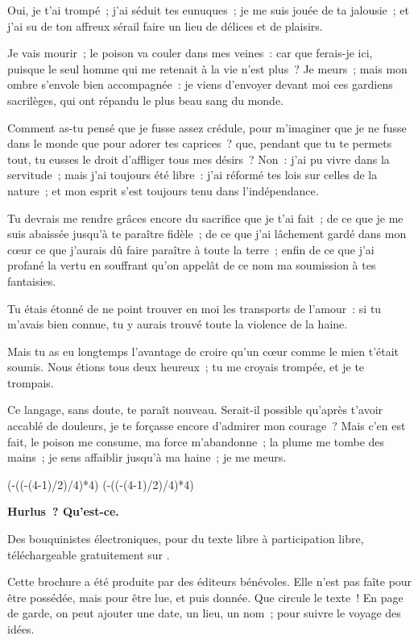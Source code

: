\documentclass[french,twoside]{book} %
\newcommand{\dateline}[1]{\medskip{\RaggedLeft{#1}\par}\bigskip}
\def\truncdiv#1#2{((#1-(#2-1)/2)/#2)}
\def\moduloop#1#2{(#1-\truncdiv{#1}{#2}*#2)}
\def\modulo#1#2{\number\numexpr\moduloop{#1}{#2}\relax}
\begin{document}
\noindent Oui, je t’ai trompé ; j’ai séduit tes eunuques ; je me suis jouée de ta jalousie ; et j’ai su de ton affreux sérail faire un lieu de délices et de plaisirs.\par
Je vais mourir ; le poison va couler dans mes veines : car que ferais-je ici, puisque le seul homme qui me retenait à la vie n’est plus ? Je meurs ; mais mon ombre s’envole bien accompagnée : je viens d’envoyer devant moi ces gardiens sacrilèges, qui ont répandu le plus beau sang du monde.\par
Comment as-tu pensé que je fusse assez crédule, pour m’imaginer que je ne fusse dans le monde que pour adorer tes caprices ? que, pendant que tu te permets tout, tu eusses le droit d’affliger tous mes désirs ? Non : j’ai pu vivre dans la servitude ; mais j’ai toujours été libre : j’ai réformé tes lois sur celles de la nature ; et mon esprit s’est toujours tenu dans l’indépendance.\par
Tu devrais me rendre grâces encore du sacrifice que je t’ai fait ; de ce que je me suis abaissée jusqu’à te paraître fidèle ; de ce que j’ai lâchement gardé dans mon cœur ce que j’aurais dû faire paraître à toute la terre ; enfin de ce que j’ai profané la vertu en souffrant qu’on appelât de ce nom ma soumission à tes fantaisies.\par
Tu étais étonné de ne point trouver en moi les transports de l’amour : si tu m’avais bien connue, tu y aurais trouvé toute la violence de la haine.\par
Mais tu as eu longtemps l’avantage de croire qu’un cœur comme le mien t’était soumis. Nous étions tous deux heureux ; tu me croyais trompée, et je te trompais.\par
Ce langage, sans doute, te paraît nouveau. Serait-il possible qu’après t’avoir accablé de douleurs, je te forçasse encore d’admirer mon courage ? Mais c’en est fait, le poison me consume, ma force m’abandonne ; la plume me tombe des mains ; je sens affaiblir jusqu’à ma haine ; je me meurs.\par

\dateline{Du sérail d’Ispahan, le 8 de la lune de Rebiab I, 1720.}
 


\ifbooklet
  \pagestyle{empty}
  \clearpage
  \ifnum\modulo{\value{page}}{4}=0 \hbox{}\newpage\hbox{}\newpage\fi
  \ifnum\modulo{\value{page}}{4}=1 \hbox{}\newpage\hbox{}\newpage\fi


  \hbox{}\newpage
  \ifodd\value{page}\hbox{}\newpage\fi
  {\centering\color{rubric}\bfseries\noindent\large
    Hurlus ? Qu’est-ce.\par
    \bigskip
  }
  \noindent Des bouquinistes électroniques, pour du texte libre à participation libre,
  téléchargeable gratuitement sur \href{https://hurlus.fr}{}.\par
  \bigskip
  \noindent Cette brochure a été produite par des éditeurs bénévoles.
  Elle n’est pas faîte pour être possédée, mais pour être lue, et puis donnée.
  Que circule le texte !
  En page de garde, on peut ajouter une date, un lieu, un nom ; pour suivre le voyage des idées.
  \par
\end{document}

